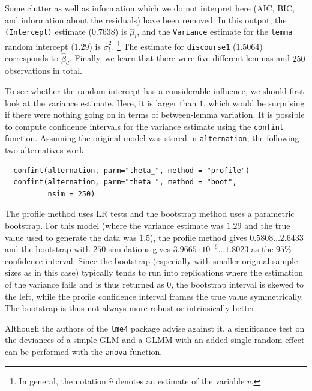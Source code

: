 \documentclass[a4paper,12pt]{article}
\begin{document}
Some clutter as well as information which we do not interpret here (AIC, BIC, and information about the residuals) have been removed.
In this output, the \texttt{(Intercept)} estimate ($0.7638$) is $\hat{\mu}_l$, and the \texttt{Variance} estimate for the \texttt{lemma} random intercept ($1.29$) is $\hat{\sigma}_l^2$.%
\footnote{In general, the notation $\hat{v}$ denotes an estimate of the variable $v$.}
The estimate for \texttt{discourse1} ($1.5064$) corresponds to $\hat{\beta}_d$.
Finally, we learn that there were five different lemmas and $250$ observations in total.

To see whether the random intercept has a considerable influence, we should first look at the variance estimate.
Here, it is larger than $1$, which would be surprising if there were nothing going on in terms of between-lemma variation.
It is possible to compute confidence intervals for the variance estimate using the \texttt{confint} function.
Assuming the original model was stored in \texttt{alternation}, the following two alternatives work.

\vspace{0.5\baselineskip}

\begin{lstlisting}
  confint(alternation, parm="theta_", method = "profile")
  confint(alternation, parm="theta_", method = "boot",
          nsim = 250)
\end{lstlisting}

The profile method uses LR tests and the bootstrap method uses a parametric bootstrap.
For this model (where the variance estimate was $1.29$ and the true value used to generate the data was $1.5$), the profile method gives $0.5808\dots2.6433$ and the bootstrap with $250$ simulations gives $3.9665\cdot10^{-6}\dots1.8023$ as the $95\%$ confidence interval.
Since the bootstrap (especially with smaller original sample sizes as in this case) typically tends to run into replications where the estimation of the variance fails and is thus returned as $0$, the bootstrap interval is skewed to the left, while the profile confidence interval frames the true value symmetrically.
The bootstrap is thus not always more robust or intrinsically better.

Although the authors of the \texttt{lme4} package advise against it, a significance test on the deviances of a simple GLM and a GLMM with an added single random effect can be performed with the \texttt{anova} function.

\vspace{0.5\baselineskip}
\end{document}
